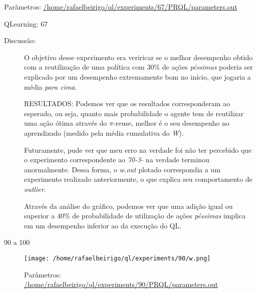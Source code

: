 \documentclass[11pt]{article}
\begin{document}
\begin{description}
\begin{description}
\begin{description}
\begin{description}
\begin{description}
\item[Parâmetros: \href{file:///home/rafaelbeirigo/ql/experiments/67/PRQL/parameters.out}{/home/rafaelbeirigo/ql/experiments/67/PRQL/parameters.out}]\label{sec-11.1.2.1.3.3.1.1}


\end{description}
\begin{description}

\item[QLearning: 67]\label{sec-11.1.2.1.3.3.1.2}


\end{description}
\begin{description}

\item[Discussão:]\label{sec-11.1.2.1.3.3.1.3}


O objetivo desse experimento era veriricar se o melhor desempenho obtido
com a reutilização de uma política com 30\% de ações \emph{péssimas} poderia
ser explicado por um desempenho extremamente bom no início, que jogaria
a média \emph{para cima}.

RESULTADOS: Podemos ver que os resultados corresponderam ao esperado, ou seja, quanto
mais probabilidade o agente tem de reutilizar uma ação ótima através do
$\pi$-reuse, melhor é o seu desempenho no aprendizado (medido pela média
cumulativa do \emph{W}).

Futuramente, pude ver que meu erro na verdade foi não ter percebido que
o experimento correspondente ao \emph{70-3-} na verdade terminou anormalmente.
Dessa forma, o \emph{w.out} plotado correspondia a um experimento realizado
anteriormente, o que explica seu comportamento de \emph{outlier}.

Através da análise do gráfico, podemos ver que uma adição igual ou superior
a 40\% de probabilidade de utilização de ações \emph{péssimas} implica em um
desempenho inferior ao da execução do QL.

\end{description}
\end{description}
\begin{description}

\item[90 a 100]\label{sec-11.1.2.1.3.3.2}


\centerline{\texttt{[image: /home/rafaelbeirigo/ql/experiments/90/w.png]}}


\begin{description}

\item[Parâmetros: \href{file:///home/rafaelbeirigo/ql/experiments/90/PRQL/parameters.out}{/home/rafaelbeirigo/ql/experiments/90/PRQL/parameters.out}]\label{sec-11.1.2.1.3.3.2.1}



\end{description}
\end{description}
\end{description}
\end{description}
\end{description}
\end{document}
